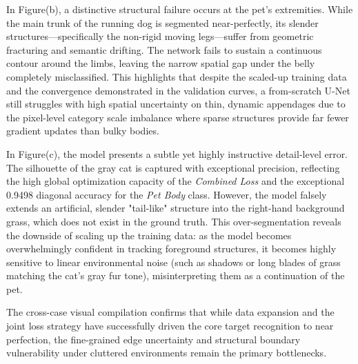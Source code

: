 In Figure(b), a distinctive structural failure occurs at the pet's extremities. While the main trunk of the running dog is segmented near-perfectly, its slender structures—specifically the non-rigid moving legs—suffer from geometric fracturing and semantic drifting. The network fails to sustain a continuous contour around the limbs, leaving the narrow spatial gap under the belly completely misclassified. This highlights that despite the scaled-up training data and the convergence demonstrated in the validation curves, a from-scratch U-Net still struggles with high spatial uncertainty on thin, dynamic appendages due to the pixel-level category scale imbalance where sparse structures provide far fewer gradient updates than bulky bodies.

In Figure(c), the model presents a subtle yet highly instructive detail-level error. The silhouette of the gray cat is captured with exceptional precision, reflecting the high global optimization capacity of the \textit{Combined Loss} and the exceptional 0.9498 diagonal accuracy for the \textit{Pet Body} class. However, the model falsely extends an artificial, slender "tail-like" structure into the right-hand background grass, which does not exist in the ground truth. This over-segmentation reveals the downside of scaling up the training data: as the model becomes overwhelmingly confident in tracking foreground structures, it becomes highly sensitive to linear environmental noise (such as shadows or long blades of grass matching the cat's gray fur tone), misinterpreting them as a continuation of the pet. 

The cross-case visual compilation confirms that while data expansion and the joint loss strategy have successfully driven the core target recognition to near perfection, the fine-grained edge uncertainty and structural boundary vulnerability under cluttered environments remain the primary bottlenecks.